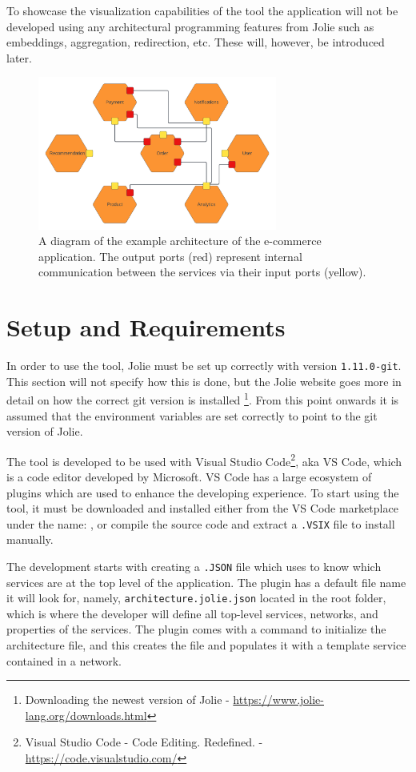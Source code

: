 To showcase the visualization capabilities of the tool the application will not be developed using any architectural programming features from Jolie such as embeddings, aggregation, redirection, etc.
These will, however, be introduced later.

\begin{figure}[h!]
    \center
    \includegraphics[width=0.70\textwidth]{figures/full_example_lc.png}
    \caption{A diagram of the example architecture of the e-commerce application. The output ports (red) represent internal communication between the services via their input ports (yellow).}
    \label{figure:full_example_lc}
\end{figure}

\section{Setup and Requirements}
In order to use the tool, Jolie must be set up correctly with version \texttt{1.11.0-git}. This section will not specify how this is done, but the Jolie website goes more in detail on how
the correct git version is installed \footnote{Downloading the newest version of Jolie - \url{https://www.jolie-lang.org/downloads.html}}. From this point onwards it is assumed that the environment variables are set correctly to point to the git version of Jolie.

The tool is developed to be used with Visual Studio Code\footnote{Visual Studio Code - Code Editing. Redefined. - \url{https://code.visualstudio.com/}}, aka VS Code, which is a code editor developed by Microsoft.
VS Code has a large ecosystem of plugins which are used to enhance the developing experience.
To start using the tool, it must be downloaded and installed either from the VS Code marketplace under the name: \texttt{\toolname}, or compile the source code and extract a \texttt{.VSIX} file to install manually.

The development starts with creating a \texttt{.JSON} file which \toolname[] uses to know which services are at the top level of the application.
The plugin has a default file name it will look for, namely, \texttt{architecture.jolie.json} located in the root folder, which is where the developer will define all top-level services, networks, and properties of the services.
The plugin comes with a command to initialize the architecture file, and this creates the file and populates it with a template service contained in a network.


